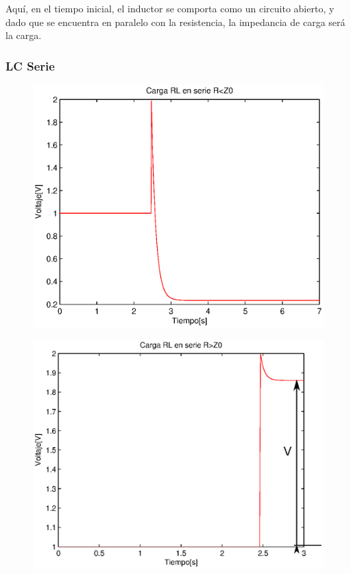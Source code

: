 \documentclass[11pt,onecolumn]{article}
\begin{document}
Aquí, en el tiempo inicial, el inductor se comporta como un circuito abierto, y dado que se encuentra en paralelo con la resistencia, la impedancia de carga será la carga.


\subsubsection{LC Serie}

\begin{figure}[H]
\centering
\includegraphics[scale=0.6]{img/RL_serie_rme0.eps}
\label{}
\end{figure}


\begin{figure}[H]
\centering
\includegraphics[scale=0.6]{img/RL_serie_rma0.eps}
\label{}
\end{figure}
\end{document}

